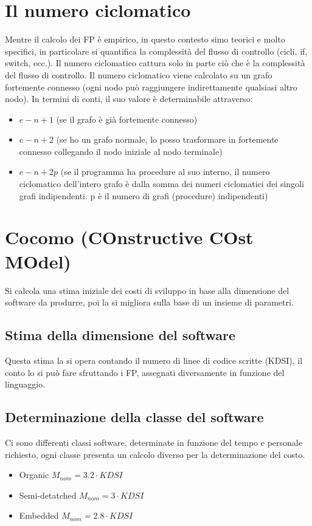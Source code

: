 \documentclass[a4paper,12pt]{report}
\begin{document}
	\section{Il numero ciclomatico}
	Mentre il calcolo dei FP è empirico, in questo contesto simo teorici e molto specifici, in particolare si quantifica la complessità del flusso di controllo (cicli, if, switch, ecc.). Il numero ciclomatico cattura solo in parte ciò che è la complessità del flusso di controllo.
	Il numero ciclomatico viene calcolato su un grafo fortemente connesso (ogni nodo può raggiungere indirettamente qualsiasi altro nodo). In termini di conti, il suo valore è determinabile attraverso:
	\begin{itemize}
		\item $e - n + 1$ (se il grafo è già fortemente connesso)
		\item $e - n + 2$ (se ho un grafo normale, lo posso trasformare in fortemente connesso collegando il nodo iniziale al nodo terminale)
		\item $e - n + 2p$ (se il programma ha procedure al suo interno, il numero ciclomatico dell'intero grafo è dalla somma dei numeri ciclomatici dei singoli grafi indipendenti. p è il numero di grafi (procedure) indipendenti)
	\end{itemize}
	\section{Cocomo (COnstructive COst MOdel)}
	Si calcola una stima iniziale dei costi di sviluppo in base alla dimensione del software da produrre, poi la si migliora sulla base di un insieme di parametri.
	\subsection{Stima della dimensione del software}
	Questa stima la si opera contando il numero di linee di codice scritte (KDSI), il conto lo si può fare sfruttando i FP, assegnati diversamente in funzione del linguaggio.
	\subsection{Determinazione della classe del software}
	Ci sono differenti classi software, determinate in funzione del tempo e personale richiesto, ogni classe presenta un calcolo diverso per la determinazione del costo.
	\begin{itemize}
		\item Organic $M_{nom} = 3.2 \cdot KDSI$
		\item Semi-detatched $M_{nom} = 3 \cdot KDSI$
		\item Embedded $M_{nom} = 2.8 \cdot KDSI$
	\end{itemize}
\end{document}
